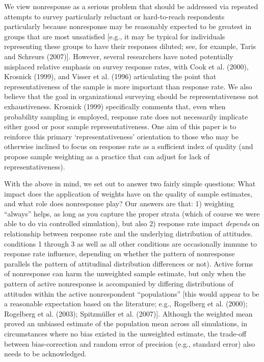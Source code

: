 \documentclass[
  man,floatsintext]{apa7}
\begin{document}
We view nonresponse as a serious problem that should be addressed via repeated attempts to survey particularly reluctant or hard-to-reach respondents particularly because nonresponse may be reasonably expected to be greatest in groups that are most unsatisfied {[}e.g., it may be typical for individuals representing these groups to have their responses diluted; see, for example, Taris and Schreurs (2007){]}. However, several researchers have noted potentially misplaced relative emphasis on survey response rates, with Cook et al. (2000), Krosnick (1999), and Visser et al. (1996) articulating the point that representativeness of the sample is more important than response rate. We also believe that the goal in organizational surveying should be representativeness not exhaustiveness. Krosnick (1999) specifically comments that, even when probability sampling is employed, response rate does not necessarily implicate either good or poor sample representativeness. One aim of this paper is to reinforce this primary `representativeness' orientation to those who may be otherwise inclined to focus on response rate as a sufficient index of quality (and propose sample weighting as a practice that can adjust for lack of representativeness).

With the above in mind, we set out to answer two fairly simple questions: What impact does the application of weights have on the quality of sample estimates, and what role does nonresponse play? Our answers are that: 1) weighting ``always'' helps, as long as you capture the proper strata (which of course we were able to do via controlled simulation), but also 2) response rate impact \emph{depends} on relationship between response rate and the underlying distribution of attitudes. conditions 1 through 3 as well as all other conditions are occasionally immune to response rate influence, depending on whether the pattern of nonresponse parallels the pattern of attitudinal distribution differences or not). Active forms of nonresponse can harm the unweighted sample estimate, but only when the pattern of active nonresponse is accompanied by differing distributions of attitudes within the active nonrespondent ``populations'' {[}this would appear to be a reasonable expectation based on the literature; e.g., Rogelberg et al. (2000); Rogelberg et al. (2003); Spitzmüller et al. (2007){]}. Although the weighted mean proved an unbiased estimate of the population mean across all simulations, in circumstances where no bias existed in the unweighted estimate, the trade-off between bias-correction and random error of precision (e.g., standard error) also needs to be acknowledged.
\end{document}
